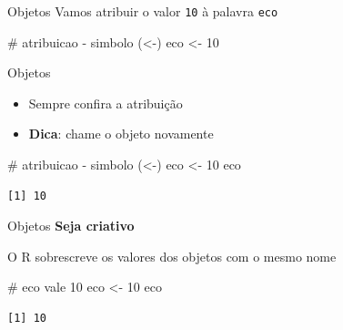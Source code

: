 \documentclass[
  ignorenonframetext,
]{beamer}
\newenvironment{Shaded}{\begin{snugshade}}{\end{snugshade}}
\newcommand{\CommentTok}[1]{\textcolor[rgb]{0.37,0.37,0.37}{#1}}
\newcommand{\DecValTok}[1]{\textcolor[rgb]{0.68,0.00,0.00}{#1}}
\newcommand{\NormalTok}[1]{\textcolor[rgb]{0.00,0.23,0.31}{#1}}
\newcommand{\OtherTok}[1]{\textcolor[rgb]{0.00,0.23,0.31}{#1}}
\begin{document}
\begin{frame}[fragile]{}
\begin{block}{Objetos}
\protect\hypertarget{objetos-1}{}
Vamos atribuir o valor \texttt{10} à palavra \texttt{eco}

\begin{Shaded}
\begin{Highlighting}[]
\CommentTok{\# atribuicao {-} simbolo (\textless{}{-})}
\NormalTok{eco }\OtherTok{\textless{}{-}} \DecValTok{10} 
\end{Highlighting}
\end{Shaded}
\end{block}
\end{frame}

\begin{frame}[fragile]{}
\protect\hypertarget{section-2}{}
\begin{block}{Objetos}
\protect\hypertarget{objetos-2}{}
\begin{itemize}
\item
  Sempre confira a atribuição
\item
  \textbf{Dica}: chame o objeto novamente
\end{itemize}

\begin{Shaded}
\begin{Highlighting}[]
\CommentTok{\# atribuicao {-} simbolo (\textless{}{-})}
\NormalTok{eco }\OtherTok{\textless{}{-}} \DecValTok{10} 
\NormalTok{eco}
\end{Highlighting}
\end{Shaded}

\begin{verbatim}
[1] 10
\end{verbatim}
\end{block}

\begin{block}{Objetos}
\protect\hypertarget{objetos-3}{}
\textbf{Seja criativo}

O R sobrescreve os valores dos objetos com o mesmo nome

\begin{Shaded}
\begin{Highlighting}[]
\CommentTok{\# eco vale 10}
\NormalTok{eco }\OtherTok{\textless{}{-}} \DecValTok{10} 
\NormalTok{eco}
\end{Highlighting}
\end{Shaded}

\begin{verbatim}
[1] 10
\end{verbatim}


\end{block}
\end{frame}
\end{document}
